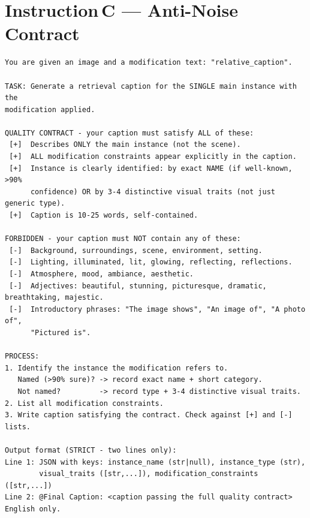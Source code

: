 \section*{Instruction\,C --- Anti-Noise Contract}
\begin{verbatim}
You are given an image and a modification text: "relative_caption".

TASK: Generate a retrieval caption for the SINGLE main instance with the
modification applied.

QUALITY CONTRACT - your caption must satisfy ALL of these:
 [+]  Describes ONLY the main instance (not the scene).
 [+]  ALL modification constraints appear explicitly in the caption.
 [+]  Instance is clearly identified: by exact NAME (if well-known, >90%
      confidence) OR by 3-4 distinctive visual traits (not just generic type).
 [+]  Caption is 10-25 words, self-contained.

FORBIDDEN - your caption must NOT contain any of these:
 [-]  Background, surroundings, scene, environment, setting.
 [-]  Lighting, illuminated, lit, glowing, reflecting, reflections.
 [-]  Atmosphere, mood, ambiance, aesthetic.
 [-]  Adjectives: beautiful, stunning, picturesque, dramatic, breathtaking, majestic.
 [-]  Introductory phrases: "The image shows", "An image of", "A photo of",
      "Pictured is".

PROCESS:
1. Identify the instance the modification refers to.
   Named (>90% sure)? -> record exact name + short category.
   Not named?         -> record type + 3-4 distinctive visual traits.
2. List all modification constraints.
3. Write caption satisfying the contract. Check against [+] and [-] lists.

Output format (STRICT - two lines only):
Line 1: JSON with keys: instance_name (str|null), instance_type (str),
        visual_traits ([str,...]), modification_constraints ([str,...])
Line 2: @Final Caption: <caption passing the full quality contract>
English only.
\end{verbatim}


